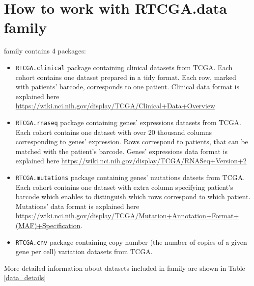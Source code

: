 \section{How to work with RTCGA.data
family}\label{how-to-work-with-rtcga.data-family}

 family contains 4 packages:

\begin{itemize}
\itemsep1pt\parskip0pt
\item
  \texttt{RTCGA.clinical} package containing clinical datasets from
  TCGA. Each cohort contains one dataset prepared in a tidy format. Each
  row, marked with patients' barcode, corresponds to one patient.
  Clinical data format is explained here
  \url{https://wiki.nci.nih.gov/display/TCGA/Clinical+Data+Overview}
\item
  \texttt{RTCGA.rnaseq} package containing genes' expressions datasets
  from TCGA. Each cohort contains one dataset with over 20 thousand
  columns corresponding to genes' expression. Rows correspond to
  patients, that can be matched with the patient's barcode. Genes'
  expressions data format is explained here
  \url{https://wiki.nci.nih.gov/display/TCGA/RNASeq+Version+2}
\item
  \texttt{RTCGA.mutations} package containing genes' mutations datsets
  from TCGA. Each cohort contains one dataset with extra column
  specifying patient's barcode which enables to distinguish which rows
  correspond to which patient. Mutations' data format is explained here
  \url{https://wiki.nci.nih.gov/display/TCGA/Mutation+Annotation+Format+(MAF)+Specification}.
\item
  \texttt{RTCGA.cnv} package containing copy number (the number of
  copies of a given gene per cell) variation datasets from TCGA.
\end{itemize}

More detailed information about datasets included in 
family are shown in Table \ref{data_details}

